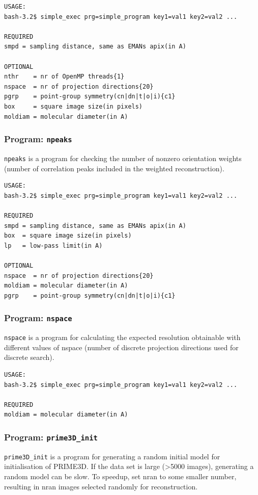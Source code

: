 \documentclass[a4paper,11pt]{article}
\newcommand{\prgname}[1]{\textcolor{NavyBlue}{\texttt{#1}}}
\begin{document}
\begin{verbatim}
USAGE:
bash-3.2$ simple_exec prg=simple_program key1=val1 key2=val2 ...

REQUIRED
smpd = sampling distance, same as EMANs apix(in A)

OPTIONAL
nthr    = nr of OpenMP threads{1}
nspace  = nr of projection directions{20}
pgrp    = point-group symmetry(cn|dn|t|o|i){c1}
box     = square image size(in pixels)
moldiam = molecular diameter(in A)
\end{verbatim}

\subsubsection{Program: \prgname{npeaks}}
\label{npeaks}
\prgname{npeaks} is a program for checking the number of nonzero orientation weights (number of correlation peaks included in the weighted reconstruction).

\begin{verbatim}
USAGE:
bash-3.2$ simple_exec prg=simple_program key1=val1 key2=val2 ...

REQUIRED
smpd = sampling distance, same as EMANs apix(in A)
box  = square image size(in pixels)
lp   = low-pass limit(in A)

OPTIONAL
nspace  = nr of projection directions{20}
moldiam = molecular diameter(in A)
pgrp    = point-group symmetry(cn|dn|t|o|i){c1}
\end{verbatim}

\subsubsection{Program: \prgname{nspace}}
\label{nspace}
\prgname{nspace} is a program for calculating the expected resolution obtainable with different values of nspace (number of discrete projection directions used for discrete search).

\begin{verbatim}
USAGE:
bash-3.2$ simple_exec prg=simple_program key1=val1 key2=val2 ...

REQUIRED
moldiam = molecular diameter(in A)
\end{verbatim}

\subsubsection{Program: \prgname{prime3D\_init}}
\label{prime3D_init}
\prgname{prime3D\_init} is a program for generating a random initial model for initialisation of PRIME3D. If the data set is large (>5000 images), generating a random model can be slow. To speedup, set nran to some smaller number, resulting in nran images selected randomly for reconstruction.
\end{document}

